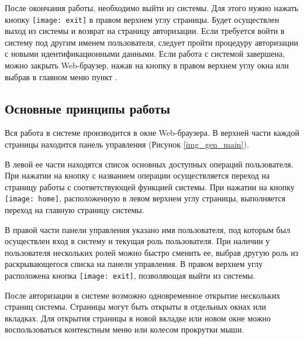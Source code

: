 После окончания работы, необходимо выйти из системы. Для этого нужно нажать кнопку \texttt{[image: exit]} в правом верхнем углу страницы. Будет осуществлен выход из системы и возврат на страницу авторизации. Если требуется войти в систему под другим именем пользователя, следует пройти процедуру авторизации с новыми идентификационными данными. Если работа с системой завершена, можно закрыть Web-браузер, нажав на кнопку  в правом верхнем углу окна или выбрав в главном меню пункт .

\subsection{Основные принципы работы}

Вся работа в системе производится в окне Web-браузера. В верхней части каждой страницы находится панель управления (Рисунок \ref{img_gen_main}).

В левой ее части находятся список основных доступных операций пользователя. При нажатии на кнопку с названием операции осуществляется переход на страницу работы с соответствующей функцией системы. При нажатии на кнопку \texttt{[image: home]}, расположенную в левом верхнем углу страницы, выполняется переход на главную страницу системы.

В правой части панели управления указано имя пользователя, под которым был осуществлен вход в систему и текущая роль пользователя. При наличии у пользователя нескольких ролей можно быстро сменить ее, выбрав другую роль из раскрывающегося списка на панели управления. В правом верхнем углу расположена кнопка \texttt{[image: exit]}, позволяющая выйти из системы.

\begin{prim}
 После авторизации в системе возможно одновременное открытие нескольких страниц системы. Страницы могут быть открыты в отдельных окнах или вкладках. Для открытия страницы в новой вкладке или новом окне можно воспользоваться контекстным меню или колесом прокрутки мыши.
\end{prim}

